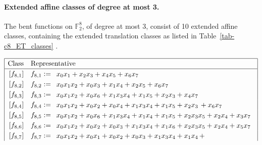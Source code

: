 \documentclass[12pt,a4paper]{article}
\newcommand{\mb}[1]{\mathbb{#1}}
\newcommand{\F}{\mb{F}}
\begin{document}
\paragraph*{Extended affine classes of degree at most 3.}
%
The bent functions on $\F_2^8$, of degree at most 3, consist of 10
extended affine classes, containing the extended translation classes as listed in Table~\ref{tab-c8_ET_classes}
\cite[Section 5.5.2]{Bra06thesis} \cite[Section 7.3]{Tok15bent}.
\begin{table}[!bhpt] %
\small{}
\begin{align*}
\def\arraystretch{1.2}
\begin{array}{|cl|}
\hline
\text{Class} &
\text{Representative}
\\
\hline
\,[f_{ 8 , 1 }] & f_{ 8 , 1 } :=
\begin{array}{l}
x_{0} x_{1} + x_{2} x_{3} + x_{4} x_{5} + x_{6} x_{7}
\end{array}
\\
\,[f_{ 8 , 2 }] & f_{ 8 , 2 } :=
\begin{array}{l}
x_{0} x_{1} x_{2} + x_{0} x_{3} + x_{1} x_{4} + x_{2} x_{5} + x_{6} x_{7}
\end{array}
\\
\,[f_{ 8 , 3 }] & f_{ 8 , 3 } :=
\begin{array}{l}
x_{0} x_{1} x_{2} + x_{0} x_{6} + x_{1} x_{3} x_{4} + x_{1} x_{5} + x_{2} x_{3} + x_{4} x_{7}
\end{array}
\\
\,[f_{ 8 , 4 }] & f_{ 8 , 4 } :=
\begin{array}{l}
x_{0} x_{1} x_{2} + x_{0} x_{2} + x_{0} x_{4} + x_{1} x_{3} x_{4} + x_{1} x_{5} + x_{2} x_{3}\, +
x_{6} x_{7}
\end{array}
\\
\,[f_{ 8 , 5 }] & f_{ 8 , 5 } :=
\begin{array}{l}
x_{0} x_{1} x_{2} + x_{0} x_{6} + x_{1} x_{3} x_{4} + x_{1} x_{4} + x_{1} x_{5} + x_{2} x_{3} x_{5}
+ x_{2} x_{4} + x_{3} x_{7}
\end{array}
\\
\,[f_{ 8 , 6 }] & f_{ 8 , 6 } :=
\begin{array}{l}
x_{0} x_{1} x_{2} + x_{0} x_{2} + x_{0} x_{3} + x_{1} x_{3} x_{4} + x_{1} x_{6} + x_{2} x_{3} x_{5}
+ x_{2} x_{4} + x_{5} x_{7}
\end{array}
\\
\,[f_{ 8 , 7 }] & f_{ 8 , 7 } :=
\begin{array}{l}
x_{0} x_{1} x_{2} + x_{0} x_{1} + x_{0} x_{2} + x_{0} x_{3} + x_{1} x_{3} x_{4} + x_{1} x_{4}\, +

\end{array}
\end{array}
\end{align*}
\end{table}
\end{document}
